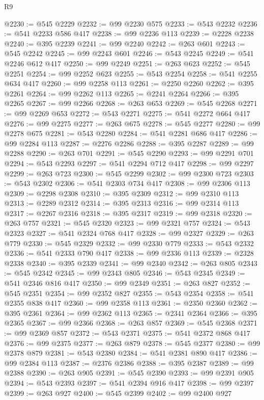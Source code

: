 \begin{lexlean}{R9}
\begin{coremodule}
@2230 := @545 @2229
@2232 := @99 @2230 @575
@2233 := @543 @2232
@2236 := @541 @2233 @586 @417
@2238 := @99 @2236 @113
@2239 := @2228 @2238
@2240 := @395 @2239
@2241 := @99 @2240
@2242 := @263 @601
@2243 := @545 @2242
@2245 := @99 @2243 @601
@2246 := @543 @2245
@2249 := @541 @2246 @612 @417
@2250 := @99 @2249
@2251 := @263 @623
@2252 := @545 @2251
@2254 := @99 @2252 @623
@2255 := @543 @2254
@2258 := @541 @2255 @634 @417
@2260 := @99 @2258 @113
@2261 := @2250 @2260
@2262 := @395 @2261
@2264 := @99 @2262 @113
@2265 := @2241 @2264
@2266 := @395 @2265
@2267 := @99 @2266
@2268 := @263 @653
@2269 := @545 @2268
@2271 := @99 @2269 @653
@2272 := @543 @2271
@2275 := @541 @2272 @664 @417
@2276 := @99 @2275
@2277 := @263 @675
@2278 := @545 @2277
@2280 := @99 @2278 @675
@2281 := @543 @2280
@2284 := @541 @2281 @686 @417
@2286 := @99 @2284 @113
@2287 := @2276 @2286
@2288 := @395 @2287
@2289 := @99 @2288
@2290 := @263 @701
@2291 := @545 @2290
@2293 := @99 @2291 @701
@2294 := @543 @2293
@2297 := @541 @2294 @712 @417
@2298 := @99 @2297
@2299 := @263 @723
@2300 := @545 @2299
@2302 := @99 @2300 @723
@2303 := @543 @2302
@2306 := @541 @2303 @734 @417
@2308 := @99 @2306 @113
@2309 := @2298 @2308
@2310 := @395 @2309
@2312 := @99 @2310 @113
@2313 := @2289 @2312
@2314 := @395 @2313
@2316 := @99 @2314 @113
@2317 := @2267 @2316
@2318 := @395 @2317
@2319 := @99 @2318
@2320 := @263 @757
@2321 := @545 @2320
@2323 := @99 @2321 @757
@2324 := @543 @2323
@2327 := @541 @2324 @768 @417
@2328 := @99 @2327
@2329 := @263 @779
@2330 := @545 @2329
@2332 := @99 @2330 @779
@2333 := @543 @2332
@2336 := @541 @2333 @790 @417
@2338 := @99 @2336 @113
@2339 := @2328 @2338
@2340 := @395 @2339
@2341 := @99 @2340
@2342 := @263 @805
@2343 := @545 @2342
@2345 := @99 @2343 @805
@2346 := @543 @2345
@2349 := @541 @2346 @816 @417
@2350 := @99 @2349
@2351 := @263 @827
@2352 := @545 @2351
@2354 := @99 @2352 @827
@2355 := @543 @2354
@2358 := @541 @2355 @838 @417
@2360 := @99 @2358 @113
@2361 := @2350 @2360
@2362 := @395 @2361
@2364 := @99 @2362 @113
@2365 := @2341 @2364
@2366 := @395 @2365
@2367 := @99 @2366
@2368 := @263 @857
@2369 := @545 @2368
@2371 := @99 @2369 @857
@2372 := @543 @2371
@2375 := @541 @2372 @868 @417
@2376 := @99 @2375
@2377 := @263 @879
@2378 := @545 @2377
@2380 := @99 @2378 @879
@2381 := @543 @2380
@2384 := @541 @2381 @890 @417
@2386 := @99 @2384 @113
@2387 := @2376 @2386
@2388 := @395 @2387
@2389 := @99 @2388
@2390 := @263 @905
@2391 := @545 @2390
@2393 := @99 @2391 @905
@2394 := @543 @2393
@2397 := @541 @2394 @916 @417
@2398 := @99 @2397
@2399 := @263 @927
@2400 := @545 @2399
@2402 := @99 @2400 @927

\end{coremodule}
\end{lexlean}
